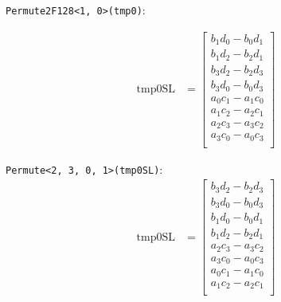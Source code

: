 \documentclass[]{scrartcl}
\begin{document}
\texttt{Permute2F128<1, 0>(tmp0)}:

\begin{align*}
\mathrm{tmp0SL} 
&=
\begin{bmatrix}
b_1d_0 - b_0d_1\\
b_1d_2 - b_2d_1\\
b_3d_2 - b_2d_3\\
b_3d_0 - b_0d_3\\
a_0c_1 - a_1c_0\\
a_1c_2 - a_2c_1\\
a_2c_3 - a_3c_2\\
a_3c_0 - a_0c_3\\
\end{bmatrix}
\end{align*}

\texttt{Permute<2, 3, 0, 1>(tmp0SL)}:
\begin{align*}
\mathrm{tmp0SL} 
&=
\begin{bmatrix}
b_3d_2 - b_2d_3\\
b_3d_0 - b_0d_3\\
b_1d_0 - b_0d_1\\
b_1d_2 - b_2d_1\\
a_2c_3 - a_3c_2\\
a_3c_0 - a_0c_3\\
a_0c_1 - a_1c_0\\
a_1c_2 - a_2c_1\\
\end{bmatrix}
\end{align*}
\end{document}
